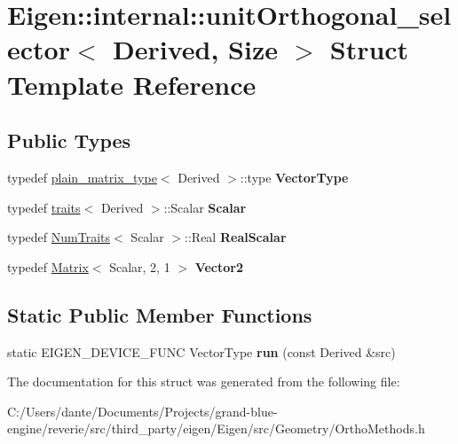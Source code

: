 \hypertarget{struct_eigen_1_1internal_1_1unit_orthogonal__selector}{}\section{Eigen\+::internal\+::unit\+Orthogonal\+\_\+selector$<$ Derived, Size $>$ Struct Template Reference}
\label{struct_eigen_1_1internal_1_1unit_orthogonal__selector}
\subsection*{Public Types}
\begin{DoxyCompactItemize}
\item 
\mbox{\label{struct_eigen_1_1internal_1_1unit_orthogonal__selector_a7c520ffbb978b132615ff5acaa17a0ff}} 
typedef \mbox{\hyperlink{struct_eigen_1_1internal_1_1plain__matrix__type}{plain\+\_\+matrix\+\_\+type}}$<$ Derived $>$\+::type {\bfseries Vector\+Type}
\item 
\mbox{\label{struct_eigen_1_1internal_1_1unit_orthogonal__selector_a5cb64d039b9a1510ece90194f6c9f0ec}} 
typedef \mbox{\hyperlink{struct_eigen_1_1internal_1_1traits}{traits}}$<$ Derived $>$\+::Scalar {\bfseries Scalar}
\item 
\mbox{\label{struct_eigen_1_1internal_1_1unit_orthogonal__selector_a6c53727bb80397fcb53e42fb76c7de1b}} 
typedef \mbox{\hyperlink{struct_eigen_1_1_num_traits}{Num\+Traits}}$<$ Scalar $>$\+::Real {\bfseries Real\+Scalar}
\item 
\mbox{\label{struct_eigen_1_1internal_1_1unit_orthogonal__selector_a79907d0ae18d8b1b56f889972fc820e8}} 
typedef \mbox{\hyperlink{class_eigen_1_1_matrix}{Matrix}}$<$ Scalar, 2, 1 $>$ {\bfseries Vector2}
\end{DoxyCompactItemize}
\subsection*{Static Public Member Functions}
\begin{DoxyCompactItemize}
\item 
\mbox{\label{struct_eigen_1_1internal_1_1unit_orthogonal__selector_aecbdce8658a875885d4326352dec272c}} 
static E\+I\+G\+E\+N\+\_\+\+D\+E\+V\+I\+C\+E\+\_\+\+F\+U\+NC Vector\+Type {\bfseries run} (const Derived \&src)
\end{DoxyCompactItemize}


The documentation for this struct was generated from the following file\+:\begin{DoxyCompactItemize}
\item 
C\+:/\+Users/dante/\+Documents/\+Projects/grand-\/blue-\/engine/reverie/src/third\+\_\+party/eigen/\+Eigen/src/\+Geometry/Ortho\+Methods.\+h\end{DoxyCompactItemize}
